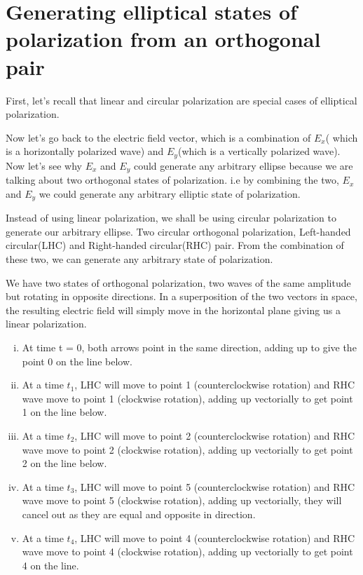 \section{Generating elliptical states of polarization from an orthogonal pair}
First, let's recall that linear and circular polarization are special cases of elliptical polarization. 

Now let's go back to the electric field vector, which is a combination of $E_{x}$( which is a horizontally polarized wave) and $E_{y}$(which is a vertically polarized wave). Now let's see why $E_{x}$ and $E_{y}$ could generate any arbitrary ellipse because we are talking about two orthogonal states of polarization. i.e by combining the two, $E_{x}$ and $E_{y}$ we could generate any arbitrary elliptic state of polarization.

Instead of using linear polarization, we shall be using circular polarization to generate our arbitrary ellipse. Two circular orthogonal polarization, Left-handed circular(LHC) and Right-handed circular(RHC) pair. From the combination of these two, we can generate any arbitrary state of polarization. 

We have two states of orthogonal polarization, two waves of the same amplitude but rotating in opposite directions. In a superposition of the two vectors in space, the resulting electric field will simply move in the horizontal plane giving us a linear polarization.

\begin{enumerate}[(i)]
\item At time t = 0, both arrows point in the same direction, adding up to give the point 0 on the line below.
\item At a time $ t_{1} $, LHC will move to point 1 (counterclockwise rotation) and RHC wave move to point 1 (clockwise rotation), adding up vectorially to get point 1 on the line below.
\item At a time $ t_{2} $, LHC will move to point 2 (counterclockwise rotation) and RHC wave move to point 2 (clockwise rotation), adding up vectorially to get point 2 on the line below.
\item At a time $ t_{3} $, LHC will move to point 5 (counterclockwise rotation) and RHC wave move to point 5 (clockwise rotation), adding up vectorially, they will cancel out as they are equal and opposite in direction.
\item At a time $ t_{4} $, LHC will move to point 4 (counterclockwise rotation) and RHC wave move to point 4 (clockwise rotation), adding up vectorially to get point 4 on the line.
\end{enumerate}

